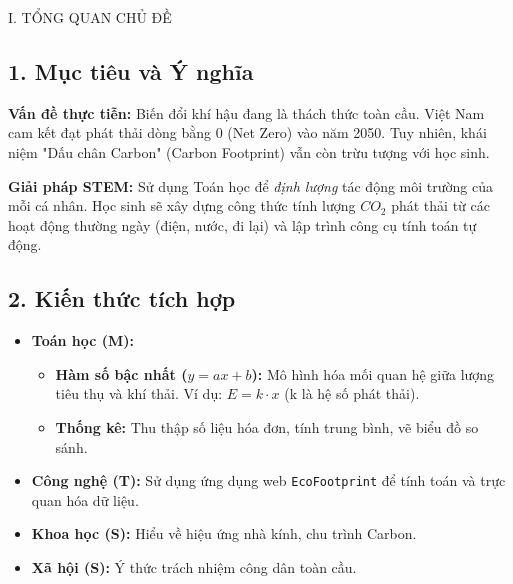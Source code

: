 \documentclass[12pt,a4paper]{article}
\begin{document}
\begin{sectionbox}{I. TỔNG QUAN CHỦ ĐỀ}
\subsection*{1. Mục tiêu và Ý nghĩa}
\textbf{Vấn đề thực tiễn:} Biến đổi khí hậu đang là thách thức toàn cầu. Việt Nam cam kết đạt phát thải dòng bằng 0 (Net Zero) vào năm 2050. Tuy nhiên, khái niệm "Dấu chân Carbon" (Carbon Footprint) vẫn còn trừu tượng với học sinh.

\textbf{Giải pháp STEM:} Sử dụng Toán học để \textit{định lượng} tác động môi trường của mỗi cá nhân. Học sinh sẽ xây dựng công thức tính lượng $CO_2$ phát thải từ các hoạt động thường ngày (điện, nước, đi lại) và lập trình công cụ tính toán tự động.

\subsection*{2. Kiến thức tích hợp}
\begin{itemize}
    \item \textbf{Toán học (M):} 
    \begin{itemize}
        \item \textbf{Hàm số bậc nhất ($y=ax+b$):} Mô hình hóa mối quan hệ giữa lượng tiêu thụ và khí thải. Ví dụ: $E = k \cdot x$ (k là hệ số phát thải).
        \item \textbf{Thống kê:} Thu thập số liệu hóa đơn, tính trung bình, vẽ biểu đồ so sánh.
    \end{itemize}
    \item \textbf{Công nghệ (T):} Sử dụng ứng dụng web \texttt{EcoFootprint} để tính toán và trực quan hóa dữ liệu.
    \item \textbf{Khoa học (S):} Hiểu về hiệu ứng nhà kính, chu trình Carbon.
    \item \textbf{Xã hội (S):} Ý thức trách nhiệm công dân toàn cầu.
\end{itemize}
\end{sectionbox}
\end{document}
